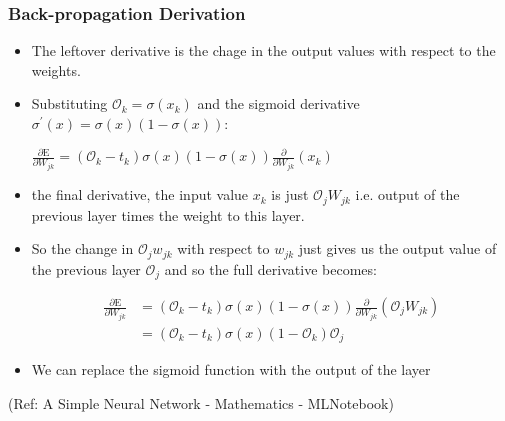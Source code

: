 \begin{frame}[fragile] \frametitle{Back-propagation Derivation}

\begin{itemize}
\item The leftover derivative is the chage in the output values with respect to the weights. 
\item Substituting $\mathcal{O}_{k} = \sigma(x_{k})$ and the sigmoid derivative
$\sigma^{\prime}( x ) = \sigma (x ) \left( 1 - \sigma ( x ) \right)$:

$\frac{\partial{\text{E}}}{\partial{W_{jk}}} =  \left( \mathcal{O}_{k} - t_{k} \right) \sigma (x ) \left( 1 - \sigma ( x ) \right) \frac{\partial{}}{\partial{W_{jk}}}  \left( x_{k}\right)$

\item the final derivative, the input value $x_{k}$ is just $\mathcal{O}_{j} W_{jk}$ i.e. output of the previous layer times the weight to this layer. 

\item So the change in $\mathcal{O}_{j} w_{jk}$ with respect to $w_{jk}$ just gives us the 
output value of the previous layer $\mathcal{O}_{j}$ and so the full derivative becomes:

\begin{align}
\frac{\partial{\text{E}}}{\partial{W_{jk}}}  &=  \left( \mathcal{O}_{k} - t_{k} \right) \sigma (x ) \left( 1 - \sigma ( x ) \right) \frac{\partial{}}{\partial{W_{jk}}}  \left( \mathcal{O}_{j} W_{jk} \right) \\[0.5em]
&=\left( \mathcal{O}_{k} - t_{k} \right) \sigma (x )  \left( 1 - \mathcal{O}_{k}  \right) \mathcal{O}_{j} 
\end{align}

\item We can replace the sigmoid function with the output of the layer
\end{itemize}

\tiny{(Ref: A Simple Neural Network - Mathematics - MLNotebook)}
\end{frame}

